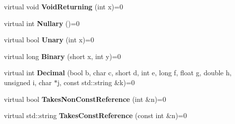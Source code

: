 \begin{DoxyCompactItemize}
\item 
\mbox{\label{classtesting_1_1gmock__generated__function__mockers__test_1_1FooInterface_adf968115cf1260004d8abe372dc71c85}} 
virtual void {\bfseries Void\+Returning} (int x)=0
\item 
\mbox{\label{classtesting_1_1gmock__generated__function__mockers__test_1_1FooInterface_a633e753eafa7f82dde22ecf9492f341c}} 
virtual int {\bfseries Nullary} ()=0
\item 
\mbox{\label{classtesting_1_1gmock__generated__function__mockers__test_1_1FooInterface_ae0885ac29bc4a3f180f6573d8b1a341e}} 
virtual bool {\bfseries Unary} (int x)=0
\item 
\mbox{\label{classtesting_1_1gmock__generated__function__mockers__test_1_1FooInterface_a59ea28b711ece054ce9d57c2dc574ba0}} 
virtual long {\bfseries Binary} (short x, int y)=0
\item 
\mbox{\label{classtesting_1_1gmock__generated__function__mockers__test_1_1FooInterface_a5a389017205848c7b7055c071cca0c6d}} 
virtual int {\bfseries Decimal} (bool b, char c, short d, int e, long f, float g, double h, unsigned i, char $\ast$j, const std\+::string \&k)=0
\item 
\mbox{\label{classtesting_1_1gmock__generated__function__mockers__test_1_1FooInterface_a694354adfffcee58093298bc12182ff5}} 
virtual bool {\bfseries Takes\+Non\+Const\+Reference} (int \&n)=0
\item 
\mbox{\label{classtesting_1_1gmock__generated__function__mockers__test_1_1FooInterface_aae85be7a3d1b53625fbeeac4694292d3}} 
virtual std\+::string {\bfseries Takes\+Const\+Reference} (const int \&n)=0
\item 

\end{DoxyCompactItemize}
